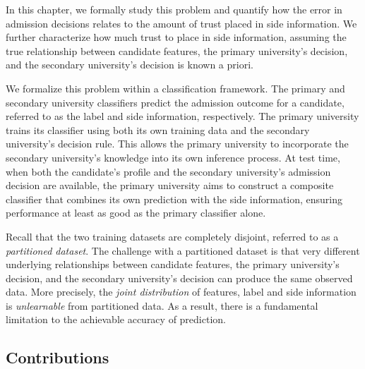 In this chapter, we formally study this problem and quantify how the error in admission decisions relates to the amount of trust placed in side information. We further characterize how much trust to place in side information, assuming the true relationship between candidate features, the primary university’s decision, and the secondary university’s decision is known a priori.

We formalize this problem within a classification framework. The primary and secondary university classifiers predict the admission outcome for a candidate, referred to as the label and side information, respectively.
The primary university trains its classifier using both its own training data and the secondary university's decision rule. This allows the primary university to incorporate the secondary university's knowledge into its own inference process.
At test time, when both the candidate’s profile and the secondary university’s admission decision are available, the primary university aims to construct a composite classifier that combines its own prediction with the side information, ensuring performance at least as good as the primary classifier alone.

Recall that the two training datasets are completely disjoint, referred to as a \textit{partitioned dataset}. The challenge with a partitioned dataset is that very different underlying relationships between candidate features, the primary university’s decision, and the secondary university’s decision can produce the same observed data. More precisely, the \textit{joint distribution} of features, label and side information is \textit{unlearnable} from partitioned data. As a result, there is a fundamental limitation to the achievable accuracy of prediction.


\subsection{Contributions}


